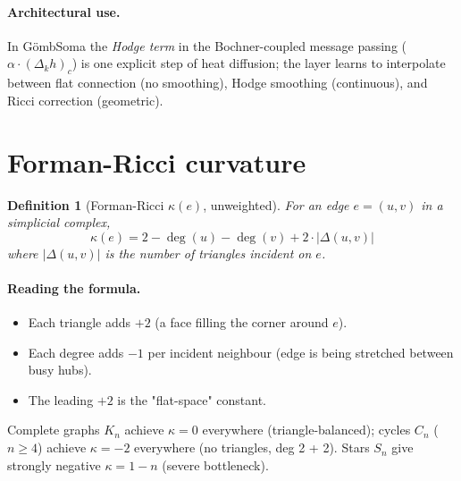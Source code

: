 \documentclass[11pt,a4paper]{article}
\newtheorem{definition}[theorem]{Definition}
\begin{document}
\paragraph{Architectural use.} In G\"ombSoma the \emph{Hodge term} in
the Bochner-coupled message passing
($\alpha \cdot (\Delta_k h)_c$) is one explicit step of heat diffusion;
the layer learns to interpolate between flat connection
(no smoothing), Hodge smoothing (continuous), and Ricci correction
(geometric).

\section{Forman-Ricci curvature}

\begin{definition}[Forman-Ricci $\kappa(e)$, unweighted]
For an edge $e = (u, v)$ in a simplicial complex,
\[
\kappa(e) = 2 - \deg(u) - \deg(v) + 2 \cdot |\Delta(u, v)|
\]
where $|\Delta(u, v)|$ is the number of triangles incident on $e$.
\end{definition}

\paragraph{Reading the formula.}
\begin{itemize}
\item Each triangle adds $+2$ (a face filling the corner around $e$).
\item Each degree adds $-1$ per incident neighbour (edge is being
  stretched between busy hubs).
\item The leading $+2$ is the "flat-space" constant.
\end{itemize}

Complete graphs $K_n$ achieve $\kappa = 0$ everywhere
(triangle-balanced); cycles $C_n$ ($n \geq 4$) achieve
$\kappa = -2$ everywhere (no triangles, deg 2 + 2). Stars $S_n$ give
strongly negative $\kappa = 1 - n$ (severe bottleneck).
\end{document}
